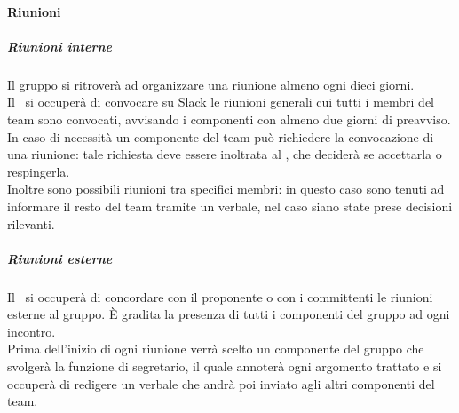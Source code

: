 	\paragraph{Riunioni}
		\subparagraph{Riunioni interne}
		Il gruppo si ritroverà ad organizzare una riunione almeno ogni dieci giorni. \\
		Il \RES \ si occuperà di convocare su Slack le riunioni generali cui tutti i membri del team sono convocati, avvisando i componenti con almeno due giorni di preavviso. \\
		In caso di necessità un componente del team può richiedere la convocazione di una riunione: tale richiesta deve essere inoltrata al \RES, che deciderà se accettarla o respingerla. \\
		Inoltre sono possibili riunioni tra specifici membri: in questo caso sono tenuti ad informare il resto del team tramite un verbale, nel caso siano state prese decisioni rilevanti. \\
		\subparagraph{Riunioni esterne}
		Il \RES  \ si occuperà di concordare con il proponente o con i committenti le riunioni esterne al gruppo. È gradita la presenza di tutti i componenti del gruppo ad ogni incontro. \\
		Prima dell'inizio di ogni riunione verrà scelto un componente del gruppo che svolgerà la funzione di segretario, il quale annoterà ogni argomento trattato e si occuperà di redigere un verbale che andrà poi inviato agli altri componenti del team.
